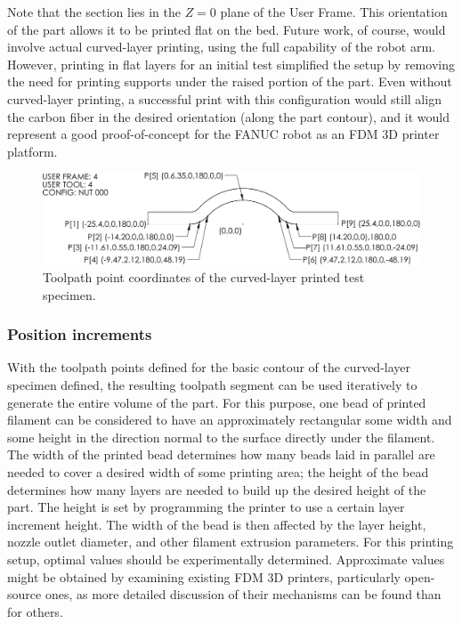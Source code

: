 Note that the section lies in the \(Z = 0\) plane of the User Frame. This orientation of the part allows it to be printed flat on the bed. Future work, of course, would involve actual curved-layer printing, using the full capability of the robot arm. However, printing in flat layers for an initial test simplified the setup by removing the need for printing supports under the raised portion of the part. Even without curved-layer printing, a successful print with this configuration would still align the carbon fiber in the desired orientation (along the part contour), and it would represent a good proof-of-concept for the FANUC robot as an FDM 3D printer platform.

\begin{figure}
    \centering
    \includegraphics[width=.9\linewidth]{figures/toolpath-coords}
    \caption{Toolpath point coordinates of the curved-layer printed test specimen.}
    \label{fig:toolpath-coords}
\end{figure}

\subsubsection{Position increments}
\label{sec:pos-incr}
With the toolpath points defined for the basic contour of the curved-layer specimen defined, the 
resulting toolpath segment can be used iteratively to generate the entire volume of the part. For this purpose, one bead of printed filament can be considered to have an approximately rectangular some width and some height in the direction normal to the surface directly under the filament. The width of the printed bead determines how many beads laid in parallel are needed to cover a desired width of some printing area; the height of the bead determines how many layers are needed to build up the desired height of the part. The height is set by programming the printer to use a certain layer increment height. The width of the bead is then affected by the layer height, nozzle outlet diameter, and other filament extrusion parameters. For this printing setup, optimal values should be experimentally determined. Approximate values might be obtained by examining existing FDM 3D printers, particularly open-source ones, as more detailed discussion of their mechanisms can be found than for others. 

